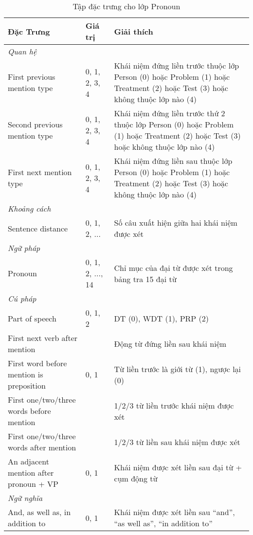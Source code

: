 \begin{table}[th]
\centering{}
\caption{Tập đặc trưng cho lớp Pronoun \label{tab:PronounFeatures}}
\footnotesize\sffamily

\begin{tabularx}{\textwidth}{@{}P{\raggedright}{0.3}lL@{}}
\toprule 
\textbf{Đặc Trưng} & \textbf{Giá trị} & \textbf{Giải thích}\\
\midrule
\emph{Quan hệ}\\
\quad First previous mention type & 0, 1, 2, 3, 4 & Khái niệm đứng liền trước thuộc lớp Person (0) hoặc Problem (1) hoặc Treatment (2) hoặc Test (3) hoặc không thuộc lớp nào (4)\\
\quad Second previous mention type & 0, 1, 2, 3, 4 & Khái niệm đứng liền trước thứ 2 thuộc lớp Person (0) hoặc Problem (1) hoặc Treatment (2) hoặc Test (3) hoặc không thuộc lớp nào (4)\\
\quad First next mention type & 0, 1, 2, 3, 4 & Khái niệm đứng liền sau thuộc lớp Person (0) hoặc Problem (1) hoặc Treatment (2) hoặc Test (3) hoặc không thuộc lớp nào (4)\\
\emph{Khoảng cách}\\
\quad Sentence distance & 0, 1, 2, ... & Số câu xuất hiện giữa hai khái niệm được xét\\
\emph{Ngữ pháp}\\
\quad Pronoun & 0, 1, 2, ..., 14 & Chỉ mục của đại từ được xét trong bảng tra 15 đại từ\\
\emph{Cú pháp}\\
\quad Part of speech & 0, 1, 2 & DT (0), WDT (1), PRP (2)\\
\quad First next verb after mention & & Động từ đứng liền sau khái niệm\\
\quad First word before mention is preposition & 0, 1 & Từ liền trước là giới từ (1), ngược lại (0)\\
\quad First one/two/three words before mention & & 1/2/3 từ liền trước khái niệm được xét\\
\quad First one/two/three words after mention & & 1/2/3 từ liền sau khái niệm được xét\\
\quad An adjacent mention after pronoun + VP  & 0, 1 & Khái niệm được xét liền sau đại từ + cụm động từ\\
\emph{Ngữ nghĩa}\\
\quad And, as well as, in addition to & 0, 1 & Khái niệm được xét liền sau ``and'', ``as well as'', ``in addition to''\\
\bottomrule
\end{tabularx}
\end{table}

